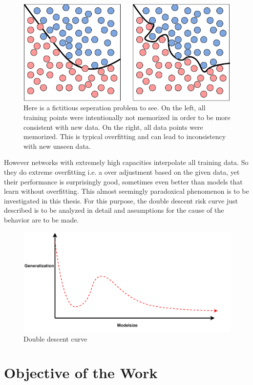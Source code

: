 \begin{figure}[!htp]
\centering
\includegraphics[width= 0.8\linewidth]{Abschlussarbeit_2021/LaTeX/images/tradoff.drawio.png}
\caption{Here is a fictitious seperation problem to see. On the left, all training points were intentionally not memorized in order to be more consistent with new data. On the right, all data points were memorized. This is typical overfitting and can lead to inconsistency with new unseen data.}
\end{figure}

However networks with extremely high capacities interpolate all training data. So they do extreme overfitting i.e. a over adjustment based on the given data, yet their performance is surprisingly good, sometimes even better than models that learn without overfitting. This almost seemingly paradoxical phenomenon is to be investigated in this thesis. For this purpose, the double descent risk curve just described is to be analyzed in detail and assumptions for the cause of the behavior are to be made. 


\begin{figure}[!htp]
\centering
\includegraphics[width= 1\linewidth]{Abschlussarbeit_2021/LaTeX/images/DoubleDescentSkizze.PNG}
\caption{Double descent curve}
\label{double_descent_risk_curve}
\end{figure}

\section{Objective of the Work}

